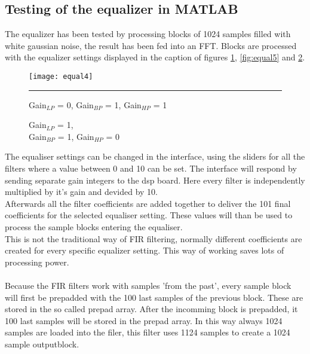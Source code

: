 \subsection{Testing of the equalizer in MATLAB}
The equalizer has been tested by processing blocks of 1024 samples filled with white gaussian noise, the result has been fed into an FFT. Blocks are processed with the equalizer settings displayed in the caption of figures \ref{fig:equal4}, \ref{fig:equal5} and \ref{fig:equal6}.\\
\begin{figure}[htbp]
\centering
\texttt{[image: equal4]}
\rule{30em}{0.5pt}
\caption{Gain$_{LP}$ = 0, Gain$_{BP}$ = 1, Gain$_{HP}$ = 1}
\label{fig:equal4}
\end{figure}
\begin{figure}[ht]
  \hfill
  \begin{minipage}[t]{.45\textwidth}
    \begin{center}  
      \caption{Gain$_{LP}$ = 1, \\ Gain$_{BP}$ = 0, Gain$_{HP}$ = 1}
      \label{fig:equal5}
    \end{center}
  \end{minipage}
  \hfill
  \begin{minipage}[t]{.45\textwidth}
    \begin{center}  
      \caption{Gain$_{LP}$ = 1, \\ Gain$_{BP}$ = 1, Gain$_{HP}$ = 0}
      \label{fig:equal6}
    \end{center}
  \end{minipage}
  \hfill
\end{figure}
The equaliser settings can be changed in the interface, using the sliders for all the filters where a value between 0 and 10 can be set. The interface will respond by sending  separate gain integers  to the dsp board. Here every filter is independently multiplied by it's gain and devided by 10. \\
Afterwards all the filter coefficients are added together to deliver the 101 final coefficients for the selected equaliser setting. These values will than be used to process the sample blocks entering the equaliser.\\
This is not the traditional way of FIR filtering, normally different coefficients are  created for every specific equalizer setting.  This way of working saves lots of processing power. \\ \\
Because the FIR filters work with samples 'from the past', every sample block will first be prepadded with the 100 last samples of the previous block.  These are stored in the so called prepad array. After the incomming block is prepadded, it 100 last samples will be stored in the prepad array. In this way always 1024 samples are loaded into the filer, this filter uses 1124 samples to create a 1024 sample outputblock. \\
